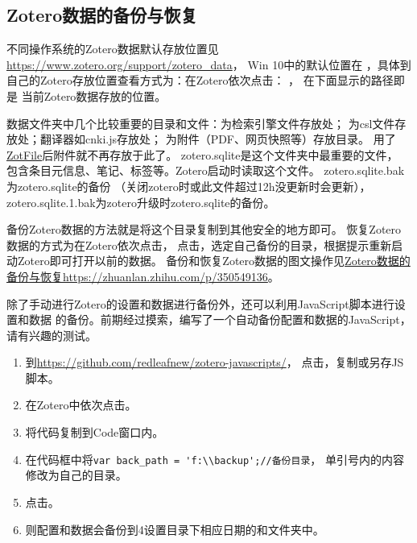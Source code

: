 \documentclass[cn,11pt,chinese]{elegantbook}
\begin{document}
		\subsection{Zotero数据的备份与恢复} \label{sec:data_dir}
					不同操作系统的Zotero数据默认存放位置见\url{https://www.zotero.org/support/zotero_data}，
					Win 10中的默认位置在
					，具体到自己的Zotero存放位置查看方式为：在Zotero依次点击：
					，
					在下面显示的路径即是
					当前Zotero数据存放的位置。
					
					数据文件夹中几个比较重要的目录和文件：为检索引擎文件存放处；
					为csl文件存放处；翻译器如cnki.js存放处；
					为附件（PDF、网页快照等）存放目录。
					用了\href{http://zotfile.com/}{ZotFile}后附件就不再存放于此了。
					zotero.sqlite是这个文件夹中最重要的文件，
					包含条目元信息、笔记、标签等。Zotero启动时读取这个文件。
					zotero.sqlite.bak为zotero.sqlite的备份
					（关闭zotero时或此文件超过12h没更新时会更新），
					zotero.sqlite.1.bak为zotero升级时zotero.sqlite的备份。
		
					备份Zotero数据的方法就是将这个目录复制到其他安全的地方即可。
					恢复Zotero数据的方式为在Zotero依次点击，
					点击，选定自己备份的目录，根据提示重新启动Zotero即可打开以前的数据。
					备份和恢复Zotero数据的图文操作见\href{https://zhuanlan.zhihu.com/p/350549136}
					{Zotero数据的备份与恢复https://zhuanlan.zhihu.com/p/350549136}。

					除了手动进行Zotero的设置和数据进行备份外，还可以利用JavaScript脚本进行设置和数据
					的备份。前期经过摸索，编写了一个自动备份配置和数据的JavaScript，请有兴趣的测试。
					\begin{enumerate}
						\item 到\href{https://github.com/redleafnew/zotero-javascripts/blob/main/8back%20up%20profile%20and%20data.js}
						{https://github.com/redleafnew/zotero-javascripts/}，
						点击，复制或另存JS脚本。
						\item 在Zotero中依次点击。
						\item 将代码复制到Code窗口内。
						\item 在代码框中将\verb|var back_path = 'f:\\backup';//备份目录|，
						单引号内的内容修改为自己的目录。
						\item 点击。
						\item 则配置和数据会备份到4设置目录下相应日期的和文件夹中。
					\end{enumerate}
					
\end{document}
